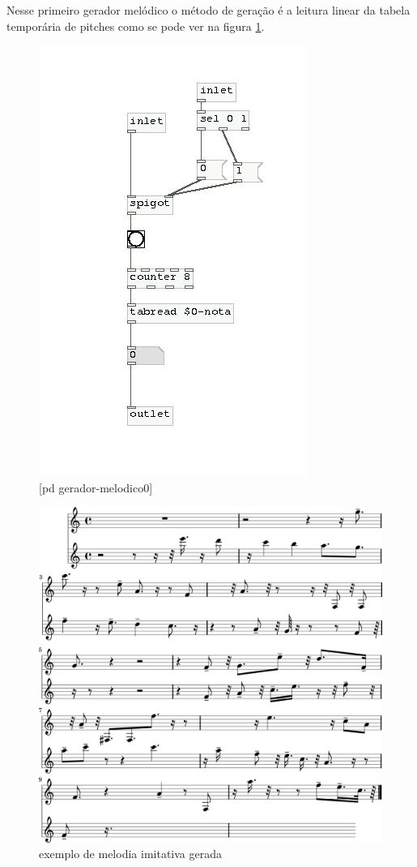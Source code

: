 \documentclass{ppgmus}
\begin{document}
Nesse primeiro gerador melódico o método de geração
é a leitura linear da tabela temporária de pitches
como se pode ver na figura \ref{gera-melodico0}.


\begin{figure}[!ht]
\includegraphics[scale=.6]{gera-melodico0}
\caption{[pd gerador-melodico0]}
\label{gera-melodico0}
\end{figure}  

\begin{figure}[!ht]
\includegraphics[scale=.55]{gera-mel0}
\caption{exemplo de melodia imitativa gerada}
\label{gera-mel0}
\end{figure}  
\end{document}
